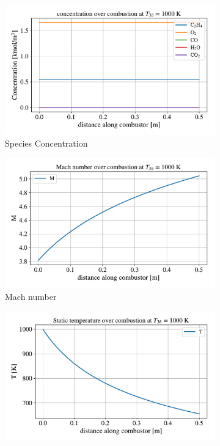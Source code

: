 \documentclass[a4paper]{article}
\begin{document}
\begin{figure}[h]
    \centering
    \begin{subfigure}[h]{0.49\linewidth}
        \includegraphics[width=\linewidth]{part_2_img/concentration_1000.pdf}
        \caption{Species Concentration}
        \label{subfig:concentration_1000}
    \end{subfigure}
    \begin{subfigure}[h]{0.49\linewidth}
        \includegraphics[width=\linewidth]{part_2_img/mach_1000.pdf}
        \caption{Mach number}
        \label{subfig:mach_1000}
    \end{subfigure}
    \begin{subfigure}[h]{0.49\linewidth}
        \includegraphics[width=\linewidth]{part_2_img/static_temp_1000.pdf}

\end{subfigure}
\end{figure}
\end{document}
